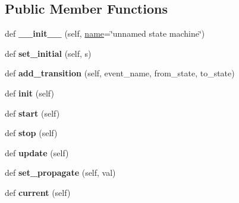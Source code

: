 \subsection*{Public Member Functions}
\begin{DoxyCompactItemize}
\item 
\mbox{\label{classelma_1_1api_1_1state__machine_1_1StateMachine_ac78c9f7d441428da577f56575950df32}} 
def {\bfseries \+\_\+\+\_\+init\+\_\+\+\_\+} (self, \hyperlink{classelma_1_1api_1_1process_1_1Process_affa061fab12e699d4d04471bfaf52a1a}{name}=\char`\"{}unnamed state machine\char`\"{})
\item 
\mbox{\label{classelma_1_1api_1_1state__machine_1_1StateMachine_a811156049fbd4acfd8104b2d83506d3a}} 
def {\bfseries set\+\_\+initial} (self, s)
\item 
\mbox{\label{classelma_1_1api_1_1state__machine_1_1StateMachine_adfb788d612f7453935d09bc39d87aa3d}} 
def {\bfseries add\+\_\+transition} (self, event\+\_\+name, from\+\_\+state, to\+\_\+state)
\item 
\mbox{\label{classelma_1_1api_1_1state__machine_1_1StateMachine_afe81dcfc4462c855a95d0088da346f77}} 
def {\bfseries init} (self)
\item 
\mbox{\label{classelma_1_1api_1_1state__machine_1_1StateMachine_aa41df28621b1c1bff35a22f4e546468d}} 
def {\bfseries start} (self)
\item 
\mbox{\label{classelma_1_1api_1_1state__machine_1_1StateMachine_ae06fd2e258a724100a32c1a2a515a415}} 
def {\bfseries stop} (self)
\item 
\mbox{\label{classelma_1_1api_1_1state__machine_1_1StateMachine_a09377453c82f6a20fa74e5b6196bbcf7}} 
def {\bfseries update} (self)
\item 
\mbox{\label{classelma_1_1api_1_1state__machine_1_1StateMachine_a33e5740993b92f934277ba3301854e1e}} 
def {\bfseries set\+\_\+propagate} (self, val)
\item 
\mbox{\label{classelma_1_1api_1_1state__machine_1_1StateMachine_a2901d43df138803f6763c96823369242}} 
def {\bfseries current} (self)
\end{DoxyCompactItemize}
